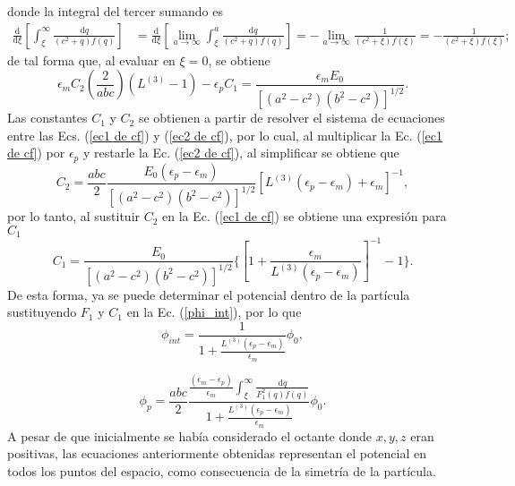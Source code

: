 donde la integral del tercer sumando es
\begin{align*}
    \frac{\text{d}}{\text{d}\xi}\left[\int_{\xi}^{\infty}\frac{\text{d}q}{(c^2+q)f(q)}\right]&=\frac{\text{d}}{\text{d}\xi}\left[\lim_{a\to\infty}\int_{\xi}^{a}\frac{\text{d}q}{(c^2+q)f(q)}\right]=-\lim_{a\to\infty}\frac{1}{(c^2+\xi)f(\xi)}=-\frac{1}{(c^2+\xi)f(\xi)};
\end{align*}
de tal forma que, al evaluar en $\xi=0$, se obtiene
\begin{equation}
    \epsilon_m C_2\left(\frac{2}{abc}\right)\left(L^{(3)}-1\right)- \epsilon_p C_1=\frac{\epsilon_m E_0}{[(a^2-c^2)(b^2-c^2)]^{1/2}}.
     \label{ec2 de cf}
\end{equation}
Las constantes $C_1$ y $C_2$ se obtienen a partir de  resolver el sistema de ecuaciones entre las Ecs. (\ref{ec1 de cf}) y (\ref{ec2 de cf}), por lo
cual, al multiplicar la Ec. (\ref{ec1 de cf}) por $\epsilon_p$ y restarle la Ec. (\ref{ec2 de cf}), al simplificar se obtiene que
\begin{equation*}
    C_2=\frac{abc}{2}\frac{E_0(\epsilon_p-\epsilon_m)}{[(a^2-c^2)(b^2-c^2)]^{1/2}}\left[L^{(3)}(\epsilon_p-\epsilon_m)+\epsilon_m\right]^{-1},
\end{equation*}
por lo tanto, al sustituir $C_2$ en la Ec. (\ref{ec1 de cf}) se obtiene una expresión para $C_1$
\begin{equation*}
    C_1=\frac{E_0}{[(a^2-c^2)(b^2-c^2)]^{1/2}}\Bigg\{ \left[1+\frac{\epsilon_m}{L^{(3)}(\epsilon_p-\epsilon_m)}\right]^{-1}-1\Bigg\}.
\end{equation*}
De esta forma, ya se puede determinar el potencial dentro de la partícula sustituyendo $F_1$ y $C_1$ en la Ec. (\ref{phi_int}), por lo que
\begin{equation}
	\phi_{int}=\frac{1}{1+\frac{L^{(3)}(\epsilon_p-\epsilon_m)}{\epsilon_m}}\phi_0,
\end{equation}

\begin{equation}
	\phi_p=\frac{abc}{2}\frac{\frac{(\epsilon_m-\epsilon_p)}{\epsilon_m}\int_{\xi}^{\infty}\frac{\text{d}q}{F_1^2(q)f(q)}}{1+\frac{L^{(3)}(\epsilon_p-\epsilon_m)}{\epsilon_m}}\phi_0.
\end{equation}
A pesar de que inicialmente se había considerado el octante donde $x,y,z$ eran positivas, las ecuaciones anteriormente obtenidas representan el potencial en todos los puntos del espacio, como consecuencia de la simetría de la partícula.\\

